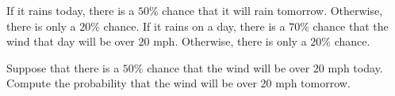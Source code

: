 If it rains today, there is a $50\%$ chance that it will rain tomorrow. Otherwise, there is only a $20\%$ chance. If it rains on a day, there is a $70\%$ chance that the wind that day will be over $20$ mph. Otherwise, there is only a $20\%$ chance.
	
	Suppose that there is a $50\%$ chance that the wind will be over $20$ mph today. Compute the probability that the wind will be over $20$ mph tomorrow.
	